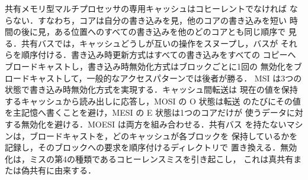 \documentclass[../main.tex]{subfiles}
\begin{document}
\begin{keypoint}[章のまとめ]
  共有メモリ型マルチプロセッサの専用キャッシュはコヒーレントでなければ
  ならない．すなわち，コアは自分の書き込みを見，他のコアの書き込みを短い
  時間の後に見，ある位置へのすべての書き込みを他のどのコアとも同じ順序で
  見る．共有バスでは，キャッシュどうしが互いの操作をスヌープし，バスが
  それらを順序付ける．書き込み時更新方式はすべての書き込みをすべての
  コピーへブロードキャストし，書き込み時無効化方式はブロックごとに1回の
  無効化をブロードキャストして，一般的なアクセスパターンでは後者が勝る．
  MSI は3つの状態で書き込み時無効化方式を実現する．キャッシュ間転送は
  現在の値を保持するキャッシュから読み出しに応答し，MOSI の O 状態は転送
  のたびにその値を主記憶へ書くことを避け，MESI の E 状態は1つのコアだけが
  使うデータに対する無効化を避ける．MOESI は両方を組み合わせる．共有バス
  を持たないマシンは，ブロードキャストを，どのキャッシュが各ブロックを
  保持しているかを記録し，そのブロックへの要求を順序付けるディレクトリで
  置き換える．無効化は，ミスの第4の種類であるコヒーレンスミスを引き起こし，
  これは真共有または偽共有に由来する．
\end{keypoint}
\end{document}
